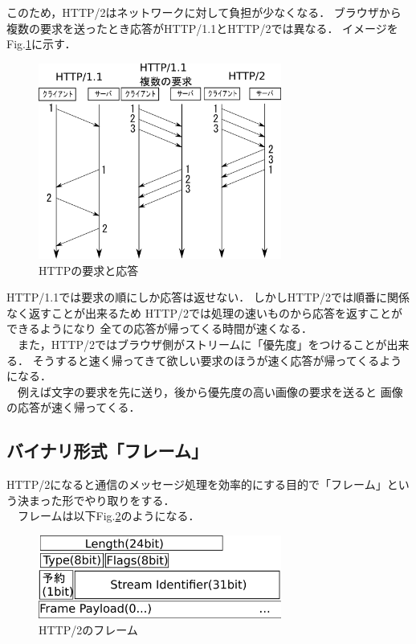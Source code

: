 \documentclass[a4j,9pt,twocolumn]{jsarticle}
\begin{document}
このため，HTTP/2はネットワークに対して負担が少なくなる．
ブラウザから複数の要求を送ったとき応答がHTTP/1.1とHTTP/2では異なる．
イメージをFig.\ref{HTTPrespons}に示す．


\begin{figure}[h]
\centering
\includegraphics[width=80mm]{img/RR4.eps}
\caption{HTTPの要求と応答}
\label{HTTPrespons}
\end{figure}

HTTP/1.1では要求の順にしか応答は返せない．
しかしHTTP/2では順番に関係なく返すことが出来るため
HTTP/2では処理の速いものから応答を返すことができるようになり
全ての応答が帰ってくる時間が速くなる．
\\　また，HTTP/2ではブラウザ側がストリームに「優先度」をつけることが出来る．
そうすると速く帰ってきて欲しい要求のほうが速く応答が帰ってくるようになる．
\\　例えば文字の要求を先に送り，後から優先度の高い画像の要求を送ると
画像の応答が速く帰ってくる．



\subsection{バイナリ形式「フレーム」}
HTTP/2になると通信のメッセージ処理を効率的にする目的で「フレーム」という決まった形でやり取りをする．
\\　フレームは以下Fig.\ref{HTTP2frame}のようになる．
\begin{figure}[h]
\centering
\includegraphics[width=80mm]{img/frame2.eps}
\caption{HTTP/2のフレーム}
\label{HTTP2frame}
\end{figure}
\end{document}
